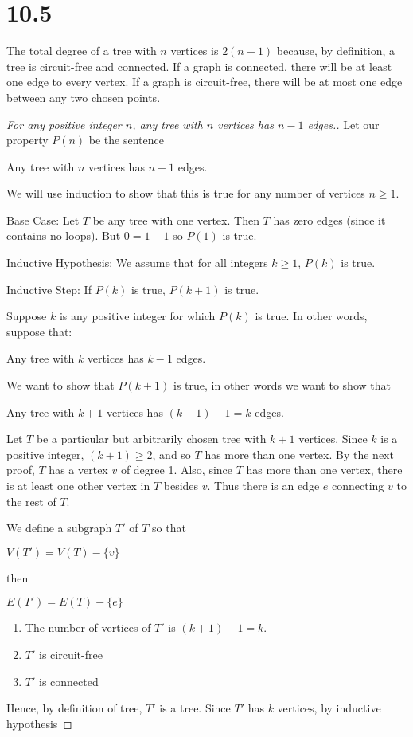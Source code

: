 \documentclass[12pt]{article}
\newenvironment{modenumerate}
  {\enumerate\setupmodenumerate}
  {\endenumerate}
\newif\ifmoditem
\newcommand{\setupmodenumerate}{%
  \global\moditemfalse
  \let\origmakelabel\makelabel
  \def\moditem##1{\global\moditemtrue\def\mesymbol{##1}\item}%
  \def\makelabel##1{%
    \origmakelabel{##1\ifmoditem\rlap{\mesymbol}\fi\enspace}%
    \global\moditemfalse}%
}
\begin{document}
\section{10.5}
\begin{modenumerate}
\setcounter{enumi}{2}
\item %
  The total degree of a tree with $n$ vertices is $2(n-1)$ because, by definition, a tree is circuit-free and
  connected. If a graph is connected, there will be at least one edge to every vertex. If a graph is
  circuit-free, there will be at most one edge between any two chosen points.
  \begin{proof}[For any positive integer $n$, any tree with $n$ vertices has $n-1$ edges.]
    Let our property $P(n)$ be the sentence

    Any tree with $n$ vertices has $n-1$ edges.

    We will use induction to show that this is true for any number of vertices $n\geq 1$.
    
    Base Case: Let $T$ be any tree with one vertex. Then $T$ has zero edges (since it contains no loops). But
    $0 = 1-1$ so $P(1)$ is true.

    Inductive Hypothesis: We assume that for all integers $k \geq 1$, $P(k)$ is true.

    Inductive Step: If $P(k)$ is true, $P(k+1)$ is true.

    Suppose $k$ is any positive integer for which $P(k)$ is true. In other words, suppose that:

    Any tree with $k$ vertices has $k -1$ edges.

    We want to show that $P(k+1)$ is true, in other words we want to show that 

    Any tree with $k+1$ vertices has $(k+1)-1 = k$ edges.

    Let $T$ be a particular but arbitrarily chosen tree with $k + 1$ vertices. Since $k$ is a positive
    integer, $(k+1) \geq 2$, and so $T$ has more than one vertex. By the next proof, $T$ has a vertex $v$ of
    degree 1. Also, since $T$ has more than one vertex, there is at least one other vertex in $T$ besides
    $v$. Thus there is an edge $e$ connecting $v$ to the rest of $T$. 

    We define a subgraph $T'$ of $T$ so that 

    $V(T') = V(T) - \{v\}$

    then

    $E(T') = E(T) - \{e\}$
    \begin{enumerate}
    \item The number of vertices of $T'$ is $(k+1)-1=k$.
    \item $T'$ is circuit-free
    \item $T'$ is connected
    \end{enumerate}
    Hence, by definition of tree, $T'$ is a tree. Since $T'$ has $k$ vertices, by inductive hypothesis


\end{proof}
\end{modenumerate}
\end{document}
